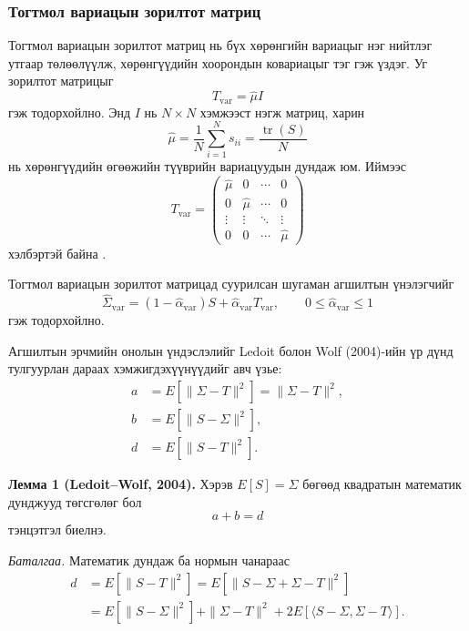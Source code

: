 
\subsubsection{Тогтмол вариацын зорилтот матриц}

Тогтмол вариацын зорилтот матриц нь бүх хөрөнгийн
вариацыг нэг нийтлэг утгаар төлөөлүүлж, хөрөнгүүдийн
хоорондын ковариацыг тэг гэж үздэг.
Уг зорилтот матрицыг
\[
T_{\mathrm{var}}=\widehat{\mu}I
\]
гэж тодорхойлно. Энд $I$ нь $N\times N$
хэмжээст нэгж матриц, харин
\[
\widehat{\mu}
=
\frac{1}{N}\sum_{i=1}^{N}s_{ii}
=
\frac{\operatorname{tr}(S)}{N}
\]
нь хөрөнгүүдийн өгөөжийн түүврийн
вариацуудын дундаж юм. Иймээс
\[
T_{\mathrm{var}}
=
\begin{pmatrix}
	\widehat{\mu}&0&\cdots&0\\
	0&\widehat{\mu}&\cdots&0\\
	\vdots&\vdots&\ddots&\vdots\\
	0&0&\cdots&\widehat{\mu}
\end{pmatrix}
\]
хэлбэртэй байна \citep{ledoitwolf2004a}.

Тогтмол вариацын зорилтот матрицад
суурилсан шугаман агшилтын үнэлэгчийг
\[
\widehat{\Sigma}_{\mathrm{var}}
=
(1-\widehat{\alpha}_{\mathrm{var}})S
+
\widehat{\alpha}_{\mathrm{var}}T_{\mathrm{var}},
\qquad
0\leq\widehat{\alpha}_{\mathrm{var}}\leq1
\]
гэж тодорхойлно.

Агшилтын эрчмийн онолын үндэслэлийг
Ledoit болон Wolf (2004)-ийн үр дүнд
тулгуурлан дараах хэмжигдэхүүнүүдийг авч үзье:
\[
\begin{aligned}
	a&=E\left[\|\Sigma-T\|^2\right]=\|\Sigma-T\|^2,\\
	b&=E\left[\|S-\Sigma\|^2\right],\\
	d&=E\left[\|S-T\|^2\right].
\end{aligned}
\]

\medskip
\noindent
\textbf{Лемма 1 (Ledoit--Wolf, 2004).}
Хэрэв $E[S]=\Sigma$ бөгөөд квадратын математик дунджууд төгсгөлөг бол
\[
a+b=d
\]
тэнцэтгэл биелнэ.

\medskip
\noindent
\textit{Баталгаа.}
Математик дундаж ба нормын чанараас
\[
\begin{aligned}
	d
	&=E\left[\|S-T\|^2\right]=E\left[\|S-\Sigma+\Sigma-T\|^2\right]\\
	&=E\left[\|S-\Sigma\|^2\right]
	+\|\Sigma-T\|^2+
	2E\left[
	\langle S-\Sigma,\Sigma-T\rangle
	\right].
\end{aligned}
\]

